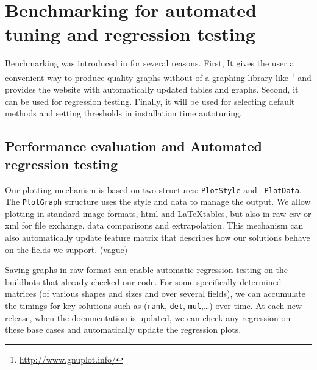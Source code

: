 \section{Benchmarking  for automated tuning and regression testing}\label{sec:bench}
%
Benchmarking was introduced in \linbox for several reasons. First, It 
gives the user a convenient way to produce quality graphs without 
of a graphing library like \gnuplot
\footnote{\url{http://www.gnuplot.info/}}
%
and provides the \linbox website with automatically updated tables and graphs.
Second, it can be used for regression testing.  Finally, it will be used for
selecting default methods and setting thresholds in installation time autotuning. %
%
\par
%
%
%
\subsection{Performance evaluation and Automated regression testing}
%
Our plotting mechanism is based on two structures: {\tt PlotStyle} and {\tt
PlotData}. The  {\tt PlotGraph} structure uses the style and data to manage the
output.  We allow plotting in standard image formats, html and \LaTeX tables,
but also in raw csv or xml for file exchange, data comparisons and
extrapolation. This mechanism can also automatically update \linbox feature
matrix that describes how our solutions behave on the fields we support. (vague)
%
\par
%
% 
%
%
%
Saving graphs in raw format can enable automatic regression testing on the
buildbots that already checked our code. For some specifically determined matrices (of
various shapes and sizes and over several fields), we can accumulate the timings
for key solutions such as ({\tt rank}, {\tt det}, {\tt mul},\ldots) over time.
At each new release, when the documentation is updated, we can check any
regression on these base cases and automatically update the regression plots.
%
